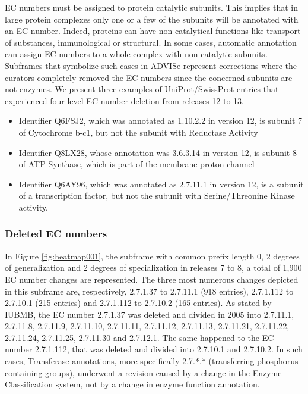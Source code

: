 EC numbers must be assigned to protein catalytic subunits. This implies that in large protein complexes only one or a few of the subunits will be annotated with an EC number. Indeed, proteins can have non catalytical functions like transport of substances, immunological or structural. In some cases, automatic annotation can assign EC numbers to a whole complex with non-catalytic subunits. Subframes that symbolize such cases in ADVISe represent corrections where the curators completely removed the EC numbers since the concerned subunits are not enzymes. We present three examples of UniProt/SwissProt entries that experienced four-level EC number deletion from releases 12 to 13. 

\begin{itemize}
\item Identifier Q6FSJ2, which was annotated as 1.10.2.2 in version 12, is subunit 7 of Cytochrome b-c1, but not the subunit with Reductase Activity
\item Identifier Q8LX28, whose annotation was 3.6.3.14 in version 12, is subunit 8 of ATP Synthase, which is part of the membrane proton channel
\item Identifier Q6AY96, which was annotated as 2.7.11.1 in version 12, is a subunit of a transcription factor, but not the subunit with Serine/Threonine Kinase activity.
\end{itemize}

\subsubsection{Deleted EC numbers}

In Figure \ref{fig:heatmap001}, the subframe with common prefix length 0, 2 degrees of generalization and 2 degrees of specialization in releases 7 to 8, a total of 1,900 EC number changes are represented. The three most numerous changes depicted in this subframe are, respectively, 2.7.1.37 to 2.7.11.1 (918 entries), 2.7.1.112 to 2.7.10.1 (215 entries) and 2.7.1.112 to 2.7.10.2 (165 entries). As stated by IUBMB, the EC number 2.7.1.37 was deleted and divided in 2005 into 2.7.11.1, 2.7.11.8, 2.7.11.9, 2.7.11.10, 2.7.11.11, 2.7.11.12, 2.7.11.13, 2.7.11.21, 2.7.11.22, 2.7.11.24, 2.7.11.25, 2.7.11.30 and 2.7.12.1. The same happened to the EC number 2.7.1.112, that was deleted and divided into 2.7.10.1 and 2.7.10.2. In such cases, Transferase annotations, more specifically 2.7.*.* (transferring phosphorus-containing groups), underwent a revision caused by a change in the Enzyme Classification system, not by a change in enzyme function annotation.

